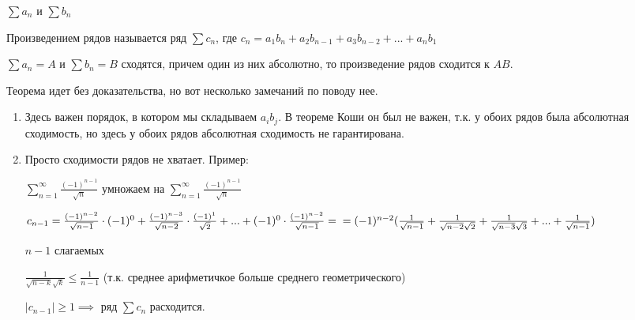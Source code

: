 \begin{definition} \thmslashn
	
	$\sum a_n$ и $\sum b_n$ 
	
	Произведением рядов называется ряд $\sum c_n$, где $c_n = a_1b_n+a_2b_{n-1}+a_3b_{n-2}+...+a_nb_1$
\end{definition}

\begin{theorem}[Мертенса] \thmslashn
	
	$\sum a_n = A$ и $\sum b_n = B$ сходятся, причем один из них абсолютно, то произведение рядов сходится к $AB$.
\end{theorem}

\begin{remark} \thmslashn
	
	Теорема идет без доказательства, но вот несколько замечаний по поводу нее.
	
	\begin{enumerate}
		\item Здесь важен порядок, в котором мы складываем $a_ib_j$. В теореме Коши он был не важен, т.к. у обоих рядов была абсолютная сходимость, но здесь у обоих рядов абсолютная сходимость не гарантирована.
		
		\item Просто сходимости рядов не хватает. Пример:
		
		$\sum\limits_{n = 1}^{\infty}\frac{(-1)^{n-1}}{\sqrt{n}}$ умножаем на $\sum\limits_{n = 1}^{\infty}\frac{(-1)^{n-1}}{\sqrt{n}}$
		
		$c_{n-1} = \frac{(-1)^{n-2}}{\sqrt{n-1}} \cdot (-1)^0 + \frac{(-1)^{n-3}}{\sqrt{n-2}} \cdot \frac{(-1)^1}{\sqrt{2}}+...  +(-1)^0 \cdot \frac{(-1)^{n-2}}{\sqrt{n-1}}=\\=
		(-1)^{n-2}(\frac{1}{\sqrt{n-1}} + \frac{1}{\sqrt{n-2}\sqrt{2}} +\frac{1}{\sqrt{n-3}\sqrt{3}} +...+\frac{1}{\sqrt{n-1}})$
		
		$n-1$ слагаемых
		
		$\frac{1}{\sqrt{n-k}\sqrt{k}} \le \frac{1}{n-1}$ (т.к. среднее арифметичкое больше среднего геометрического)
		
		$|c_{n-1}| \ge 1 \implies$ ряд $\sum c_n$ расходится.
	\end{enumerate}
\end{remark}